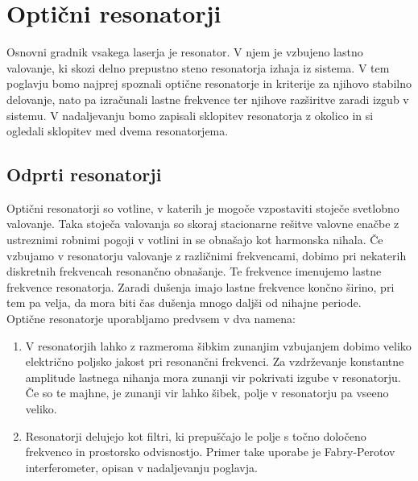 
\chapter{Optični resonatorji}

Osnovni gradnik vsakega laserja je resonator. V njem je vzbujeno lastno valovanje,
ki skozi delno prepustno steno resonatorja izhaja iz sistema. V tem poglavju bomo 
najprej spoznali optične resonatorje in kriterije za njihovo stabilno delovanje,
nato pa izračunali lastne frekvence ter njihove razširitve zaradi izgub v sistemu. 
V nadaljevanju bomo zapisali sklopitev 
resonatorja z okolico in si ogledali sklopitev med dvema resonatorjema.

\section{Odprti resonatorji}

Optični resonatorji so votline, v katerih je mogoče 
vzpostaviti stoječe svetlobno valovanje. Taka stoječa valovanja so skoraj 
stacionarne rešitve valovne enačbe z ustreznimi robnimi pogoji v votlini 
in se obnašajo kot harmonska nihala. Če vzbujamo v resonatorju valovanje z 
različnimi frekvencami, dobimo pri nekaterih diskretnih frekvencah resonančno
obnašanje. Te frekvence imenujemo lastne frekvence
resonatorja. Zaradi dušenja imajo lastne frekvence končno širino, pri tem pa
velja, da mora biti čas dušenja mnogo daljši od nihajne periode. \\

\noindent
Optične resonatorje uporabljamo predvsem v dva namena:\\
\begin{enumerate}
\item V resonatorjih lahko z razmeroma šibkim zunanjim vzbujanjem dobimo veliko
električno poljsko jakost pri resonančni frekvenci. Za vzdrževanje
konstantne amplitude lastnega nihanja mora zunanji vir pokrivati izgube
v resonatorju. Če so te majhne, je zunanji vir lahko šibek, polje
v resonatorju pa vseeno veliko.\\
\item Resonatorji delujejo kot filtri, ki prepuščajo le polje s točno  
določeno frekvenco in prostorsko odvisnostjo. Primer take uporabe je 
Fabry-Perotov interferometer, opisan 
v nadaljevanju poglavja. \\
\end{enumerate}

